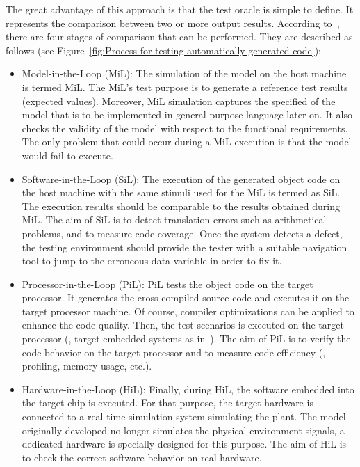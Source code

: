The great advantage of this approach is that the test oracle is simple to define. It represents the comparison between two or more output results. According to~\cite{shokry2009model,stuermer2007systematic}, there are four stages of comparison that can be performed. They are described as follows (see Figure~\ref{fig:Process for testing automatically generated code}):
 
\begin{itemize}
	\item Model-in-the-Loop (MiL): 
	The simulation of the model on the host machine is termed MiL. 
    The MiL's test purpose is to generate a reference test results (expected values). Moreover, MiL simulation captures the specified  of the model that is to be implemented in general-purpose language later on. It also checks the validity of the model with respect to the functional requirements. The only problem that could occur during a MiL execution is that the model would fail to execute.

	\item Software-in-the-Loop (SiL): 
	The execution of the generated object code on the host machine with the same stimuli used for the MiL is termed as SiL. The execution results should be comparable to the results obtained during MiL. 
	The aim of SiL is to detect translation errors such as arithmetical problems, and to measure code coverage.
	Once the system detects a defect, the testing environment should provide the tester with a suitable navigation tool to jump to the erroneous data variable in order to fix it.
	
	\item Processor-in-the-Loop (PiL): 
	PiL tests the object code on the target processor. It generates the cross compiled source code and executes it on the target processor machine. Of course, compiler optimizations can be applied to enhance the code quality. Then, the test scenarios is executed on the target processor (\eg, target embedded systems as in~\cite{shokry2009model}). The aim of PiL is to verify the code behavior on the target processor and to measure code efficiency (\eg, profiling, memory usage, etc.).
	
	\item Hardware-in-the-Loop (HiL): 
	Finally, during HiL, the software embedded into the target chip is executed. For that purpose, the target hardware is connected to a real-time simulation system simulating the plant. The model originally developed no longer simulates the physical environment signals, a dedicated hardware is specially designed for this purpose. The aim of HiL is to check the correct software behavior on real hardware.
\end{itemize}

